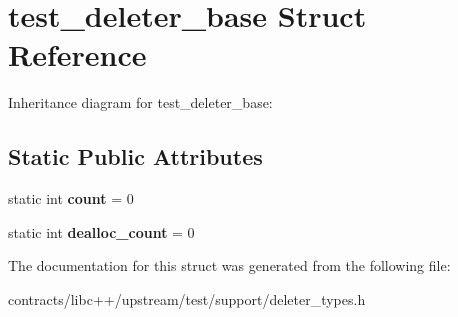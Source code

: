 \hypertarget{structtest__deleter__base}{}\section{test\+\_\+deleter\+\_\+base Struct Reference}
\label{structtest__deleter__base}


Inheritance diagram for test\+\_\+deleter\+\_\+base\+:
\subsection*{Static Public Attributes}
\begin{DoxyCompactItemize}
\item 
\mbox{\label{structtest__deleter__base_a7c0daa5ba5bcc236ee9501e52d77182e}} 
static int {\bfseries count} = 0
\item 
\mbox{\label{structtest__deleter__base_a0f1ceba933013c2d792f01a2c610ab42}} 
static int {\bfseries dealloc\+\_\+count} = 0
\end{DoxyCompactItemize}


The documentation for this struct was generated from the following file\+:\begin{DoxyCompactItemize}
\item 
contracts/libc++/upstream/test/support/deleter\+\_\+types.\+h\end{DoxyCompactItemize}
